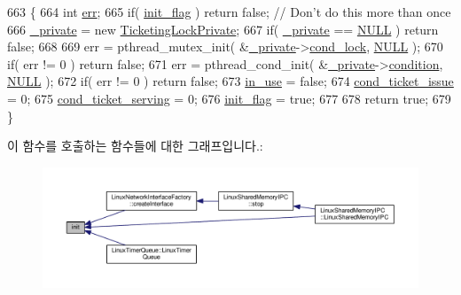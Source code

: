 \begin{DoxyCode}
663                          \{
664     \textcolor{keywordtype}{int} \hyperlink{gst__avb__playbin_8c_a6ce68847c12434f60d1b2654a3dc3409}{err};
665     \textcolor{keywordflow}{if}( \hyperlink{class_ticketing_lock_a9298e04a9d0130ff1545e0914d419de5}{init\_flag} ) \textcolor{keywordflow}{return} \textcolor{keyword}{false};  \textcolor{comment}{// Don't do this more than once}
666     \hyperlink{class_ticketing_lock_a351c5faad8218bb8571b5d784b7f364f}{\_private} = \textcolor{keyword}{new} \hyperlink{struct_ticketing_lock_private}{TicketingLockPrivate};
667     \textcolor{keywordflow}{if}( \hyperlink{class_ticketing_lock_a351c5faad8218bb8571b5d784b7f364f}{\_private} == \hyperlink{openavb__types__base__pub_8h_a070d2ce7b6bb7e5c05602aa8c308d0c4}{NULL} ) \textcolor{keywordflow}{return} \textcolor{keyword}{false};
668 
669     err = pthread\_mutex\_init( &\hyperlink{class_ticketing_lock_a351c5faad8218bb8571b5d784b7f364f}{\_private}->\hyperlink{struct_ticketing_lock_private_ae3e5051fe73e5989a4d275ba3f947f64}{cond\_lock}, \hyperlink{openavb__types__base__pub_8h_a070d2ce7b6bb7e5c05602aa8c308d0c4}{NULL} );
670     \textcolor{keywordflow}{if}( err != 0 ) \textcolor{keywordflow}{return} \textcolor{keyword}{false};
671     err = pthread\_cond\_init( &\hyperlink{class_ticketing_lock_a351c5faad8218bb8571b5d784b7f364f}{\_private}->\hyperlink{struct_ticketing_lock_private_a2d017047068ee847b500c14427ac4d6b}{condition}, \hyperlink{openavb__types__base__pub_8h_a070d2ce7b6bb7e5c05602aa8c308d0c4}{NULL} );
672     \textcolor{keywordflow}{if}( err != 0 ) \textcolor{keywordflow}{return} \textcolor{keyword}{false};
673     \hyperlink{class_ticketing_lock_a7768b84c51671204cc736430f48246a0}{in\_use} = \textcolor{keyword}{false};
674     \hyperlink{class_ticketing_lock_a8b7a3b091ea1d5901833b1b38d7d5338}{cond\_ticket\_issue} = 0;
675     \hyperlink{class_ticketing_lock_a4ee669f5608abcc6ffdfc0f5df01e6cf}{cond\_ticket\_serving} = 0;
676     \hyperlink{class_ticketing_lock_a9298e04a9d0130ff1545e0914d419de5}{init\_flag} = \textcolor{keyword}{true};
677 
678     \textcolor{keywordflow}{return} \textcolor{keyword}{true};
679 \}
\end{DoxyCode}


이 함수를 호출하는 함수들에 대한 그래프입니다.\+:
\nopagebreak
\begin{figure}[H]
\begin{center}
\leavevmode
\includegraphics[width=350pt]{class_ticketing_lock_aee8048628ff2b5c026c9e15acdcaacb8_icgraph}
\end{center}
\end{figure}


